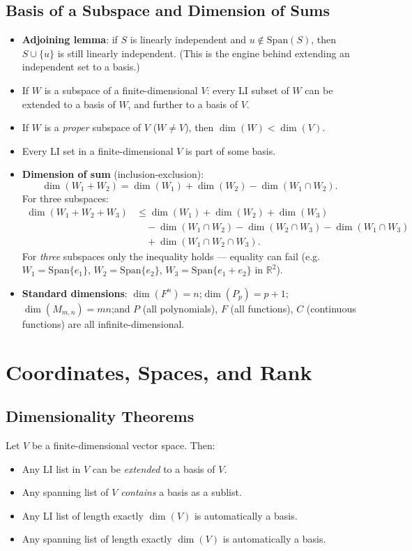 \documentclass[hidelinks]{article}
\begin{document}
\subsection{Basis of a Subspace and Dimension of Sums}
\begin{itemize}
    \item \textbf{Adjoining lemma}: if $S$ is linearly independent and $u\notin\mathrm{Span}(S)$, then $S\cup\{u\}$ is still linearly independent. (This is the engine behind extending an independent set to a basis.)
    \item If $W$ is a subspace of a finite-dimensional $V$: every LI subset of $W$ can be extended to a basis of $W$, and further to a basis of $V$.
    \item If $W$ is a \emph{proper} subspace of $V$ ($W \neq V$), then $\dim(W) < \dim(V)$.
    \item Every LI set in a finite-dimensional $V$ is part of some basis.
    \item \textbf{Dimension of sum} (inclusion-exclusion):
    \[
        \dim(W_1 + W_2) = \dim(W_1) + \dim(W_2) - \dim(W_1 \cap W_2).
    \]
    For three subspaces:
    \begin{align*}
        \dim(W_1+W_2+W_3) &\leq \dim(W_1)+\dim(W_2)+\dim(W_3) \\
        &\quad -\dim(W_1\cap W_2)-\dim(W_2\cap W_3)-\dim(W_1\cap W_3) \\
        &\quad +\dim(W_1\cap W_2\cap W_3).
    \end{align*}
    For \emph{three} subspaces only the inequality holds — equality can fail (e.g.\ $W_1 = \mathrm{Span}\{e_1\}$, $W_2=\mathrm{Span}\{e_2\}$, $W_3 = \mathrm{Span}\{e_1+e_2\}$ in $\mathbb{R}^2$).
    \item \textbf{Standard dimensions}: $\dim(F^n) = n$;\quad $\dim(P_p) = p+1$;\quad $\dim(M_{m,n}) = mn$;\quad and $P$ (all polynomials), $F$ (all functions), $C$ (continuous functions) are all infinite-dimensional.
\end{itemize}

\section{Coordinates, Spaces, and Rank}

\subsection{Dimensionality Theorems}
Let $V$ be a finite-dimensional vector space. Then:
\begin{itemize}
    \item Any LI list in $V$ can be \emph{extended} to a basis of $V$.
    \item Any spanning list of $V$ \emph{contains} a basis as a sublist.
    \item Any LI list of length exactly $\dim(V)$ is automatically a basis.
    \item Any spanning list of length exactly $\dim(V)$ is automatically a basis.
\end{itemize}
\end{document}
